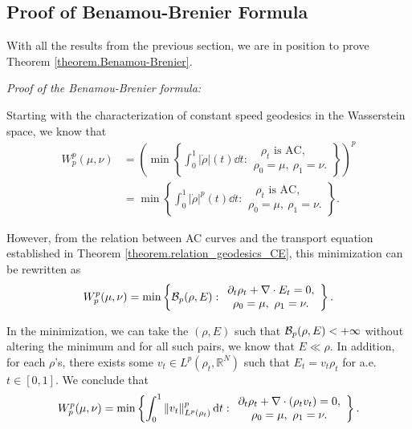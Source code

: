 \subsection{Proof of Benamou-Brenier Formula}

With all the results from the previous section, we are in position to prove Theorem \ref{theorem.Benamou-Brenier}. 

{\em Proof of the Benamou-Brenier formula:}

Starting with the characterization of constant speed geodesics in the Wasserstein space, we know that
\begin{align*}
	W^p_p(\mu, \nu) 
	&= \left(
	\min 
	\left\{
		\int_0^1 |\dot{\rho}|(t)\dd t: 
		\begin{array}{c}
			\text{ $\rho_t$ is AC},\\
			\rho_0 = \mu, \ \rho_1 = \nu. 
		\end{array}
	\right\}
	\right)^p \\
	&= \min 
	\left\{
		\int_0^1 |\dot{\rho}|^p(t)\dd t:
		\begin{array}{c}
		\text{ $\rho_t$ is AC},\\
		\rho_0 = \mu, \ \rho_1 = \nu. 
		\end{array}
	\right\}.
\end{align*}

However, from the relation between AC curves and the transport equation established in Theorem \ref{theorem.relation_geodesics_CE}, this minimization can be rewritten as
\begin{equation*}
	W^p_p(\mu, \nu) 
	= \mathop{\rm min} 
	\left\{
	\mathcal{B}_p(\rho, E):
	\begin{array}{c}
	\partial_t \rho_t + \nabla \cdot E_t = 0,\\
	\rho_0 = \mu, \ \rho_1 = \nu. 
	\end{array}
	\right\}.
\end{equation*} 

In the minimization, we can take the $(\rho, E)$ such that $\mathcal{B}_p(\rho, E) < +\infty$ without altering the minimum and for all such pairs, we know that $E \ll \rho$. In addition, for each $\rho$'s, there exists some $v_t \in L^p(\rho_t, \mathbb{R}^N)$ such that $E_t = v_t \rho_ t$ for a.e. $t \in [0,1]$. We conclude that 
\begin{equation*}
	W^p_p(\mu, \nu) 
	= \mathop{\rm min} 
	\left\{
	\int_0^1 \left\lVert v_t\right\rVert^p_{L^p(\rho_t)}{\rm d} t:
	\begin{array}{c}
	\partial_t \rho_t + \nabla \cdot \left(\rho_t v_t\right) = 0,\\
	\rho_0 = \mu, \ \rho_1 = \nu. 
	\end{array}
	\right\}.
\end{equation*}
\findem


